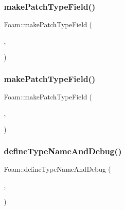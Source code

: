 \mbox{\label{namespaceFoam_a8c06a28eb97f5e5b64a8c6a2b7c22ad4}} 
\subsubsection{\texorpdfstring{make\+Patch\+Type\+Field()}{makePatchTypeField()}\hspace{0.1cm}{\footnotesize\ttfamily [3/7]}}
{\footnotesize\ttfamily Foam\+::make\+Patch\+Type\+Field (\begin{DoxyParamCaption}\item[{fv\+Patch\+Vector\+Field}]{,  }\item[{\hyperlink{classFoam_1_1gapContactFvPatchVectorField}{gap\+Contact\+Fv\+Patch\+Vector\+Field}}]{ }\end{DoxyParamCaption})}

\mbox{\label{namespaceFoam_a5c6e58e7e59e421d7406e5bded0843ac}} 
\subsubsection{\texorpdfstring{make\+Patch\+Type\+Field()}{makePatchTypeField()}\hspace{0.1cm}{\footnotesize\ttfamily [4/7]}}
{\footnotesize\ttfamily Foam\+::make\+Patch\+Type\+Field (\begin{DoxyParamCaption}\item[{fv\+Patch\+Vector\+Field}]{,  }\item[{\hyperlink{classFoam_1_1tractionDisplacementFvPatchVectorField}{traction\+Displacement\+Fv\+Patch\+Vector\+Field}}]{ }\end{DoxyParamCaption})}

\mbox{\label{namespaceFoam_ad01923059b59c983334f8b78cbd710f5}} 
\subsubsection{\texorpdfstring{define\+Type\+Name\+And\+Debug()}{defineTypeNameAndDebug()}\hspace{0.1cm}{\footnotesize\ttfamily [45/50]}}
{\footnotesize\ttfamily Foam\+::define\+Type\+Name\+And\+Debug (\begin{DoxyParamCaption}\item[{\hyperlink{classFoam_1_1pyInterp}{py\+Interp}}]{,  }\item[{0}]{ }\end{DoxyParamCaption})}

